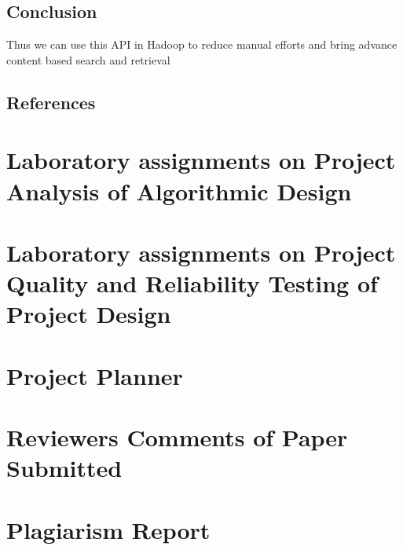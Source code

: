\documentclass[oneside,a4paper,12pt]{report}
\begin{document}
\section{Conclusion}
Thus we can use this API in Hadoop to reduce manual efforts and bring advance content based search and retrieval



\begin{center}
\chapter{References}
\newpage
\end{center}

\newpage

\begin{appendices}
\chapter{Laboratory assignments on Project Analysis of Algorithmic Design}
\chapter{Laboratory assignments on Project Quality and Reliability Testing of Project Design}
\chapter{Project Planner}
\chapter{Reviewers Comments of Paper Submitted}
\chapter{Plagiarism Report}
\end{appendices}
\end{document}
